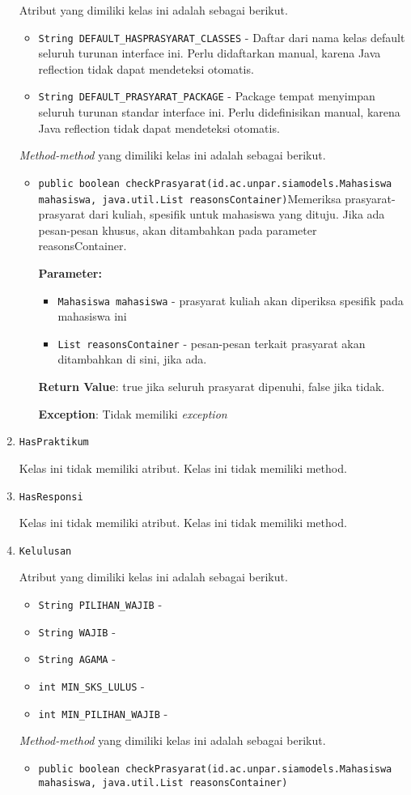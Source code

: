\documentclass{article}
\begin{document}
\begin{enumerate}
Atribut yang dimiliki kelas ini adalah sebagai berikut.
\begin{itemize}
\item \texttt{String DEFAULT\_HASPRASYARAT\_CLASSES} - Daftar dari nama kelas default seluruh turunan interface ini. Perlu didaftarkan
 manual, karena Java reflection tidak dapat mendeteksi otomatis.
\item \texttt{String DEFAULT\_PRASYARAT\_PACKAGE} - Package tempat menyimpan seluruh turunan standar interface ini. Perlu didefinisikan
 manual, karena Java reflection tidak dapat mendeteksi otomatis.
\end{itemize}
\textit{Method-method} yang dimiliki kelas ini adalah sebagai berikut.
\begin{itemize}
\item \texttt{public boolean checkPrasyarat(id.ac.unpar.siamodels.Mahasiswa mahasiswa, java.util.List reasonsContainer)}Memeriksa prasyarat-prasyarat dari kuliah, spesifik untuk mahasiswa
 yang dituju. Jika ada pesan-pesan khusus, akan ditambahkan pada parameter
 reasonsContainer.

\textbf{Parameter:}
\begin{itemize}
\item \texttt{Mahasiswa mahasiswa} - 
prasyarat kuliah akan diperiksa spesifik pada mahasiswa ini
\item \texttt{List reasonsContainer} - 
pesan-pesan terkait prasyarat akan ditambahkan di sini, jika ada.
\end{itemize}
\textbf{Return Value}: true jika seluruh prasyarat dipenuhi, false jika tidak.

\textbf{Exception}: Tidak memiliki \textit{exception}

\end{itemize}
\item \texttt{HasPraktikum}



Kelas ini tidak memiliki atribut. Kelas ini tidak memiliki method. \item \texttt{HasResponsi}



Kelas ini tidak memiliki atribut. Kelas ini tidak memiliki method. \item \texttt{Kelulusan}



Atribut yang dimiliki kelas ini adalah sebagai berikut.
\begin{itemize}
\item \texttt{String PILIHAN\_WAJIB} - 
\item \texttt{String WAJIB} - 
\item \texttt{String AGAMA} - 
\item \texttt{int MIN\_SKS\_LULUS} - 
\item \texttt{int MIN\_PILIHAN\_WAJIB} - 
\end{itemize}
\textit{Method-method} yang dimiliki kelas ini adalah sebagai berikut.
\begin{itemize}
\item \texttt{public boolean checkPrasyarat(id.ac.unpar.siamodels.Mahasiswa mahasiswa, java.util.List reasonsContainer)}


\end{itemize}
\end{enumerate}
\end{document}
